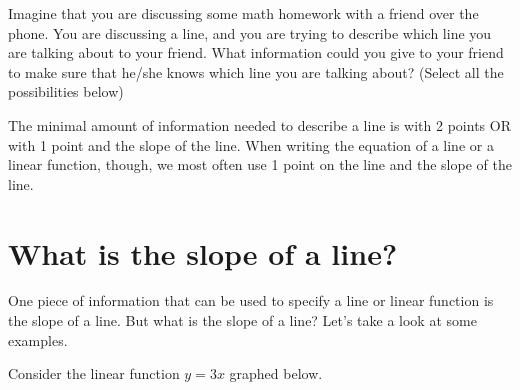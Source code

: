 \documentclass{ximera}
\begin{document}
\begin{exercise}
Imagine that you are discussing some math homework with a friend over the phone.  You are discussing a line, and you are trying to describe which line you are talking about to your friend.  What information could you give to your friend to make sure that he/she knows which line you are talking about?  (Select all the possibilities below)

\begin{selectAll}
\end{selectAll}

\begin{explanation}
The minimal amount of information needed to describe a line is with 2 points OR with 1 point and the slope of the line.  When writing the equation of a line or a linear function, though, we most often use 1 point on the line and the slope of the line.  
\end{explanation}

\section{What is the slope of a line?}

One piece of information that can be used to specify a line or linear function is the slope of a line.  But what is the slope of a line?  Let's take a look at some examples.  

\begin{example}
Consider the linear function $y = 3x$ graphed below.  
\begin{image}
\end{image}


\end{example}
\end{exercise}
\end{document}
